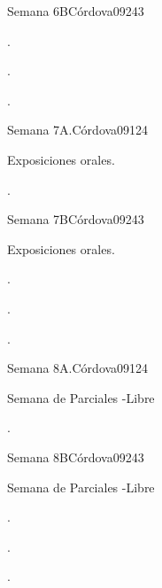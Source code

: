 \begin{syllabus}
\begin{unit}{}{Semana 6B}{Córdova09}{24}{3}
   \begin{learningoutcomes}
      \item . 
      \item .
      \item . 
      \end{learningoutcomes}
\end{unit}

\begin{unit}{}{Semana 7A.}{Córdova09}{12}{4}
   \begin{topics}
      \item Exposiciones orales.
   \end{topics}
   \begin{learningoutcomes}
      \item . 
   \end{learningoutcomes}
\end{unit}

\begin{unit}{}{Semana 7B}{Córdova09}{24}{3}
   \begin{topics}
      \item Exposiciones orales.
   \end{topics}

   \begin{learningoutcomes}
      \item . 
      \item .
      \item . 
      \end{learningoutcomes}
\end{unit}

\begin{unit}{}{Semana 8A.}{Córdova09}{12}{4}
   \begin{topics}
      \item Semana de Parciales -Libre
   \end{topics}
   \begin{learningoutcomes}
      \item . 
   \end{learningoutcomes}
\end{unit}

\begin{unit}{}{Semana 8B}{Córdova09}{24}{3}
   \begin{topics}
      \item Semana de Parciales -Libre
   \end{topics}

   \begin{learningoutcomes}
      \item . 
      \item .
      \item . 
      \end{learningoutcomes}
\end{unit}


\end{syllabus}
